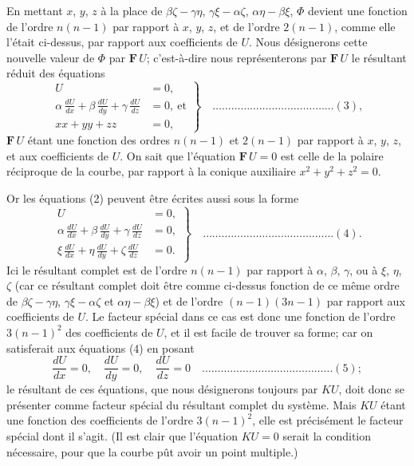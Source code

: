 \documentclass[12pt,a4paper]{article}
\theoremstyle{plain}
\begin{document}
En mettant $x$, $y$, $z$ \`a la place de $\beta\zeta - \gamma\eta$, $\gamma\xi - \alpha\zeta$, $\alpha\eta - \beta\xi$, $\Phi$ devient une fonction de l'ordre $n(n-1)$ par rapport \`a $x$, $y$, $z$, et de l'ordre $2(n-1)$, comme elle l'\'etait ci-dessus, par rapport aux coefficients de $U$. Nous d\'esignerons cette nouvelle valeur de $\Phi$ par $\mathbf{F}\,U$; c'est-\`a-dire nous repr\'esenterons par $\mathbf{F}\,U$ le r\'esultant r\'eduit des \'equations
\[
\left. \begin{aligned}
U &= 0, \\
\alpha\,\frac{dU}{dx} + \beta\,\frac{dU}{dy} + \gamma\,\frac{dU}{dz} &= 0, \ \text{et} \\
xx + yy + zz &= 0,
\end{aligned} \right\} \quad \ldots \ldots \ldots \ldots \ldots \ldots \ldots \ldots \ldots \ldots \ldots \ldots \ldots (3),
\]
$\mathbf{F}\,U$ \'etant une fonction des ordres $n(n-1)$ et $2(n-1)$ par rapport \`a $x$, $y$, $z$, et aux coefficients de $U$. On sait que l'\'equation $\mathbf{F}\,U = 0$ est celle de la polaire r\'eciproque de la courbe, par rapport \`a la conique auxiliaire $x^2 + y^2 + z^2 = 0$.

Or les \'equations (2) peuvent \^etre \'ecrites aussi sous la forme
\[
\left. \begin{aligned}
U &= 0, \\
\alpha\,\frac{dU}{dx} + \beta\,\frac{dU}{dy} + \gamma\,\frac{dU}{dz} &= 0, \\
\xi\,\frac{dU}{dx} + \eta\,\frac{dU}{dy} + \zeta\,\frac{dU}{dz} &= 0.
\end{aligned} \right\} \quad \ldots \ldots \ldots \ldots \ldots \ldots \ldots \ldots \ldots \ldots \ldots \ldots \ldots \ldots (4).
\]
Ici le r\'esultant complet est de l'ordre $n(n-1)$ par rapport \`a $\alpha$, $\beta$, $\gamma$, ou \`a $\xi$, $\eta$, $\zeta$ (car ce r\'esultant complet doit \^etre comme ci-dessus fonction de ce m\^eme ordre de $\beta\zeta - \gamma\eta$, $\gamma\xi - \alpha\zeta$ et $\alpha\eta - \beta\xi$) et de l'ordre $(n-1)(3n-1)$ par rapport aux coefficients de $U$. Le facteur sp\'ecial dans ce cas est donc une fonction de l'ordre $3(n-1)^2$ des coefficients de $U$, et il est facile de trouver sa forme; car on satisferait aux \'equations (4) en posant
\[
\frac{dU}{dx} = 0, \quad \frac{dU}{dy} = 0, \quad \frac{dU}{dz} = 0 \quad \ldots \ldots \ldots \ldots \ldots \ldots \ldots \ldots \ldots \ldots \ldots \ldots \ldots \ldots (5);
\]
le r\'esultant de ces \'equations, que nous d\'esignerons toujours par $\mathit{K}U$, doit donc se pr\'esenter comme facteur sp\'ecial du r\'esultant complet du syst\`eme. Mais $\mathit{K}U$ \'etant une fonction des coefficients de l'ordre $3(n-1)^2$, elle est pr\'ecis\'ement le facteur sp\'ecial dont il s'agit. (Il est clair que l'\'equation $\mathit{K}U = 0$ serait la condition n\'ecessaire, pour que la courbe p\^ut avoir un point multiple.)
\end{document}
